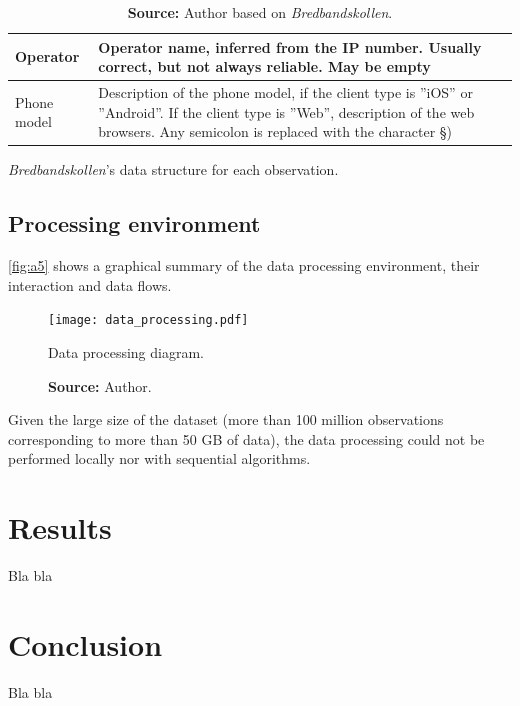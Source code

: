 \documentclass[12pt]{article}
\begin{document}
\begin{table}[H]
\begin{tabular}{|>{\raggedright\arraybackslash}m{30mm}|m{120mm}|}
\hline 
Operator & Operator name, inferred from the IP number. Usually correct, but not always reliable. May be empty  \\ 
\hline 
Phone model & Description of the phone model, if the client type is ”iOS” or ”Android”. If the client type is ”Web”, description of the web browsers. Any semicolon is replaced with the character §) \\ 
\hline 
\end{tabular} 
\egroup
  \caption{\textit{Bredbandskollen}'s data structure for each observation.}
  \caption*{\textbf{Source:} Author based on \textit{Bredbandskollen}.}
        \label{tab:t2}  
\end{table}

\subsection{Processing environment}

\autoref{fig:a5} shows a graphical summary of the data processing environment, their interaction and data flows.

\begin{figure}[H]
    \centering
        \texttt{[image: data\_processing.pdf]}
        \caption{Data processing diagram.}
        \caption*{\textbf{Source:} Author.}
        \label{fig:a6}
\end{figure}   

Given the large size of the dataset (more than 100 million observations corresponding to more than 50 GB of data), the data processing could not be performed locally nor with sequential algorithms.     


\section{Results} \label{res}
Bla bla
\section{Conclusion}
Bla bla




\end{document}
